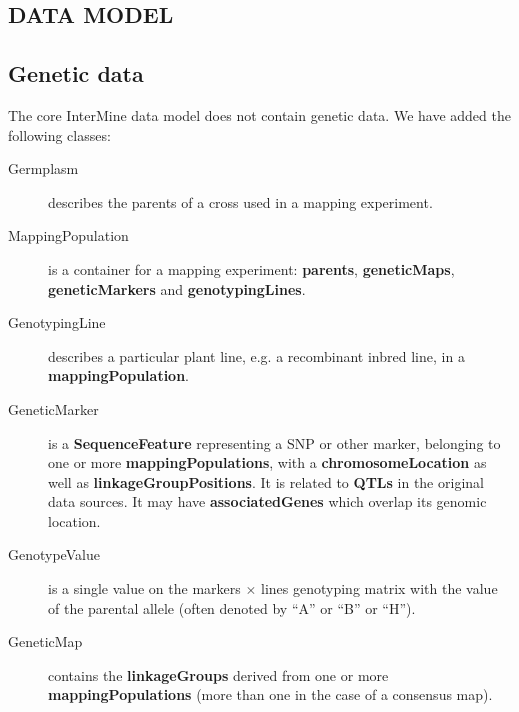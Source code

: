 \documentclass[]{pagposter}
\begin{document}
\begin{multicols*}{3}
  \color{Black}


  \section*{DATA MODEL}

  \subsection*{Genetic data}

  The core InterMine data model does not contain genetic data. We have added the following classes:

  \begin{description}

    \item[Germplasm] describes the parents of a cross used in a mapping experiment.

    \item[MappingPopulation] is a container for a mapping experiment: \textbf{parents}, \textbf{geneticMaps}, \textbf{geneticMarkers} and \textbf{genotypingLines}.
      
    \item[GenotypingLine] describes a particular plant line, e.g. a recombinant inbred line, in a \textbf{mappingPopulation}.
      
    \item[GeneticMarker] is a \textbf{SequenceFeature} representing a SNP or other marker, belonging to one or more \textbf{mappingPopulations},
      with a \textbf{chromosomeLocation} as well as \textbf{linkageGroupPositions}.
      It is related to \textbf{QTLs} in the original data sources. It may have \textbf{associatedGenes} which overlap its genomic location.
      
    \item[GenotypeValue] is a single value on the markers $\times$ lines genotyping matrix with the value of the parental allele (often denoted by ``A'' or ``B'' or ``H'').
      
    \item[GeneticMap] contains the \textbf{linkageGroups} derived from one or more \textbf{mappingPopulations} (more than one in the case of a consensus map).
      

\end{description}
\end{multicols*}
\end{document}
